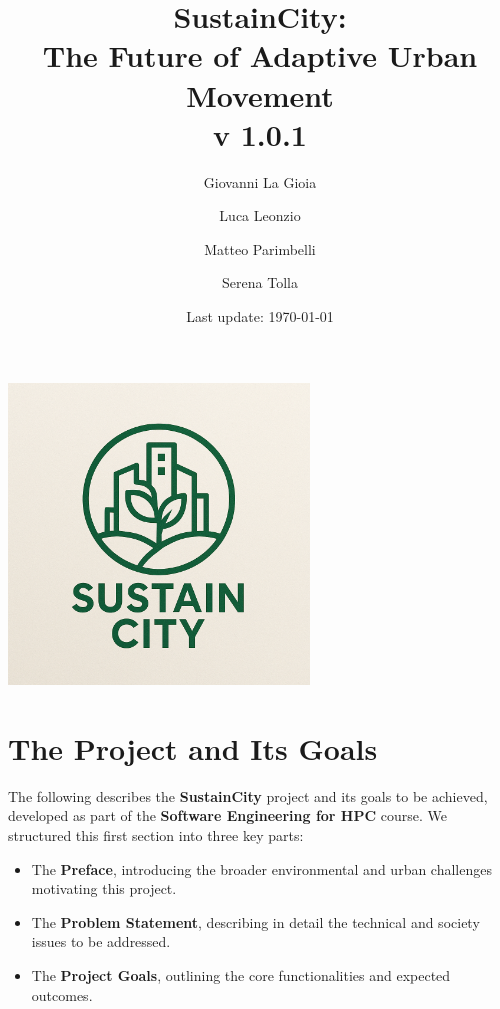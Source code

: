 \documentclass[a4paper,12pt]{article}
\title{SustainCity: \\ The Future of Adaptive Urban Movement \\ v 1.0.1}
\author[1]{Giovanni La Gioia}
\author[2]{Luca Leonzio}
\author[3]{Matteo Parimbelli}
\author[4]{Serena Tolla}
\affil[1,2,3,4]{Politecnico di Milano}
\date{Last update: \today}
\begin{document}
\maketitle
\vspace{2cm}
\begin{center}
    \includegraphics[width=0.6\textwidth]{diagrams/SustainCity_logo.png}
\end{center}
\newpage
\tableofcontents
\clearpage
\newpage

\section{The Project and Its Goals}
The following describes the \textbf{SustainCity} project and its goals to be achieved, developed as part of the \textbf{Software Engineering for HPC} course. We structured this first section into three key parts:
\begin{itemize}
    \item The \textbf{Preface}, introducing the broader environmental and urban challenges motivating this project.
    \item The \textbf{Problem Statement}, describing in detail the technical and society issues to be addressed.
    \item The \textbf{Project Goals}, outlining the core functionalities and expected outcomes.
\end{itemize}
\end{document}
